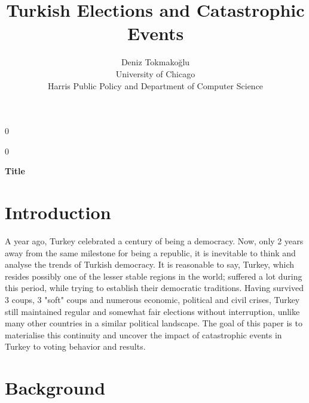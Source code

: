 \documentclass[12pt]{article}
\newcommand{\blind}{0}
\begin{document}
%

\def\spacingset#1{\renewcommand{\baselinestretch}%
{#1}\small\normalsize} \spacingset{1}



\blind
{
  \title{\bf Turkish Elections and Catastrophic Events}
    {
}
\author{\name Deniz Tokmako{\u{g}}lu\\
       \addr University of Chicago\\Harris Public Policy and Department of Computer Science\\
       \address{\href{https://github.com/deniztokmakoglu/turkish_election_analysis}{GitHub Page}}}
\maketitle


  \maketitle
} \fi

\blind
{
  \bigskip
  \bigskip
  \bigskip
  \begin{center}
    {\LARGE\bf Title}
\end{center}
  \medskip
} \fi

\spacingset{1.45} %
\section{Introduction}
\label{sec:intro}

A year ago, Turkey celebrated a century of being a democracy. Now, only 2 years away from the same milestone for being a republic, it is inevitable to think and analyse the trends of Turkish democracy. 
It is reasonable to say, Turkey, which resides possibly one of the lesser stable regions in the world; suffered a lot during this period, while trying to establish their democratic traditions. Having survived 3 coups, 3 "soft" coups and numerous economic, political and civil crises, Turkey still maintained regular and somewhat fair elections without interruption, unlike many other countries in a similar political landscape. The goal of this paper is to materialise this continuity and uncover the impact of catastrophic events in Turkey to voting behavior and results. 

\section{Background}
\end{document}
